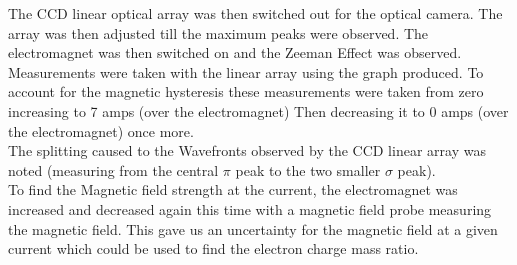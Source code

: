 \documentclass[a4paper,11pt]{article}
\begin{document}
The CCD linear optical array was then switched out for the optical camera. The array was then adjusted till the maximum peaks were observed. The electromagnet was then switched on and the Zeeman Effect was observed. Measurements were taken with the linear array using the graph produced. To account for the magnetic hysteresis these measurements were taken from zero increasing to 7 amps (over the electromagnet) Then decreasing it to 0 amps (over the electromagnet) once more.\\

The splitting caused to the Wavefronts observed by the CCD linear array was noted (measuring from the central $\pi$ peak to the two smaller $\sigma$ peak).\\

To find the Magnetic field strength at the current, the electromagnet was increased and decreased again this time with a magnetic field probe measuring the magnetic field. This gave us an uncertainty for the magnetic field at a given current which could be used to find the electron charge mass ratio.
\end{document}
